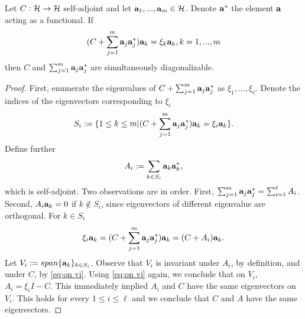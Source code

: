 \documentclass{amsart}
\numberwithin{equation}{section}
\begin{document}
\begin{lemma}\label{lemma:sim diag}
  Let $C:\mathcal{H} \to \mathcal{H}$ self-adjoint and let $\mathbf{a}_1,...,\mathbf{a}_m \in
  \mathcal{H}$. Denote $\mathbf{a}^*$ the element $\mathbf{a}$ acting as a
  functional. If
  \begin{equation*}
   (C + \sum_{j=1}^m \mathbf{a}_j\mathbf{a}_j^*) \mathbf{a}_k = \xi_k \mathbf{a}_k, k = 1,...,m
  \end{equation*}
  then $C$ and $\sum_{j=1}^m \mathbf{a}_j \mathbf{a}_j^*$ are simultaneously
  diagonalizable.
\end{lemma}
\begin{proof}
  First, enumerate the eigenvalues of $C + \sum_{j=1}^m
  \mathbf{a}_j\mathbf{a}_j^*$ as $\xi_1,...,\xi_\ell$. Denote the
  indices of the eigenvectors corresponding to $\xi_i$
  \begin{equation*}
    S_i := \{ 1 \leq k \leq m | (C + \sum_{j=1}^m \mathbf{a}_j\mathbf{a}_j^* )\mathbf{a}_k = \xi_i \mathbf{a}_k \}.
  \end{equation*}
  Define further
  \begin{equation*}
    A_i := \sum_{k \in S_i} \mathbf{a}_k \mathbf{a}_k^*,
  \end{equation*}
  which is self-adjoint. Two observations are in order. First,
  $\sum_{j=1}^m \mathbf{a}_j\mathbf{a}_j^* = \sum_{i=1}^\ell A_i$. Second, $A_i
  \mathbf{a}_k = 0$ if $k\not \in S_i$, since eigenvectors of different
  eigenvalue are orthogonal. For $k \in S_i$
  \begin{equation}\label{eq:on vi}
    \xi_i \mathbf{a}_k = (C + \sum_{j=1}^m \mathbf{a}_j \mathbf{a}_j^* ) \mathbf{a}_k = (C + A_i) \mathbf{a}_k.
  \end{equation}
  Let $V_i := span \{\mathbf{a}_k \}_{k\in S_i}$. Observe that $V_i$ is
  invariant under $A_i$, by definition, and under $C$, by \eqref{eq:on
    vi}. Using \eqref{eq:on vi} again, we conclude that on $V_i$, $A_i
  = \xi_iI - C$. This immediately implied $A_i$ and $C$ have the
  same eigenvectors on $V_i$. This holds for every $1 \leq i \leq
  \ell$ and we conclude that $C$ and $A$ have the same eigenvectors.
\end{proof}
\end{document}
